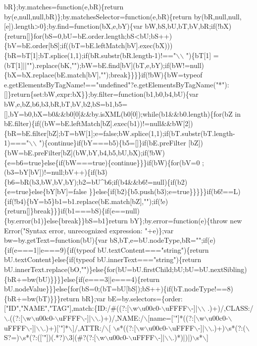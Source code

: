 \begin{DoxyCode}
{       bR\};by.matches=function(e,bR)\{return by(e,null,null,bR)\};by.matchesSelector=function(e,bR)\{return
       by(bR,null,null,[e]).length>0\};by.find=function(bX,e,bY)\{var
       bW,bS,bU,bT,bV,bR;if(!bX)\{return[]\}for(bS=0,bU=bE.order.length;bS<bU;bS++)\{bV=bE.order[bS];if((bT=bE.leftMatch[bV].exec(bX)))\{bR=bT[1];bT.splice(1,1);if(bR.substr(bR.length-1)!=="\(\backslash\)\(\backslash\)
      ")\{bT[1]
      =(bT[1]||"").replace(bK,"");bW=bE.find[bV](bT,e,bY);if(bW!=null)\{bX=bX.replace(bE.match[bV],"");break\}\}\}\}if(!bW)\{bW=typeof
       e.getElementsByTagName!=="undefined"?e.getElementsByTagName("*"):[]\}return\{set:bW,expr:bX\}\};by.filter=function(b1,b0,b4,bU)\{var
       bW,e,bZ,b6,b3,bR,bT,bV,b2,bS=b1,b5=[],bY=b0,bX=b0&&b0[0]&&by.isXML(b0[0]);while(b1&&b0.length)\{for(bZ in
       bE.filter)\{if((bW=bE.leftMatch[bZ].exec(b1))!=null&&bW[2])\{bR=bE.filter[bZ];bT=bW[1];e=false;bW.splice(1,1);if(bT.substr(bT.length-1)==="\(\backslash\)\(\backslash\)
      ")\{continue\}if(bY===b5)\{b5=[]\}if(bE.preFilter
      [bZ])\{bW=bE.preFilter[bZ](bW,bY,b4,b5,bU,bX);if(!bW)\{e=b6=true\}else\{if(bW===true)\{continue\}\}\}if(bW)\{for(bV=0
      ;(b3=bY[bV])!=null;bV++)\{if(b3)\{b6=bR(b3,bW,bV,bY);b2=bU^b6;if(b4&&b6!=null)\{if(b2)\{e=true\}else\{bY[bV]=false
      \}\}else\{if(b2)\{b5.push(b3);e=true\}\}\}\}\}if(b6!==L)\{if(!b4)\{bY=b5\}b1=b1.replace(bE.match[bZ],"");if(!e)\{return[]\}break\}\}\}if(b1===bS)\{if(e==null)\{by.error(b1)\}else\{break\}\}bS=b1\}return bY\};by.error=function(e)\{throw new
       Error("Syntax error, unrecognized expression: "+e)\};var bw=by.getText=function(bU)\{var
       bS,bT,e=bU.nodeType,bR="";if(e)\{if(e===1||e===9)\{if(typeof bU.textContent==="string")\{return bU.textContent\}else\{if(typeof
       bU.innerText==="string")\{return
       bU.innerText.replace(bO,"")\}else\{for(bU=bU.firstChild;bU;bU=bU.nextSibling)\{bR+=bw(bU)\}\}\}\}else\{if(e===3||e===4)\{return
       bU.nodeValue\}\}\}else\{for(bS=0;(bT=bU[bS]);bS++)\{if(bT.nodeType!==8)\{bR+=bw(bT)\}\}\}return bR\};var bE=by.selectors=\{order:["ID","NAME","TAG"],match:\{ID:/#((?:[\(\backslash\)w\(\backslash\)u00c0-\(\backslash\)uFFFF\(\backslash\)-]|\(\backslash\)\(\backslash\)
      .)+)/,CLASS:/\(\backslash\).((?:[\(\backslash\)w\(\backslash\)u00c0-\(\backslash\)uFFFF\(\backslash\)-]|\(\backslash\)\(\backslash\).)+)/,NAME:/\(\backslash\)[name=['}\textcolor{stringliteral}{"]*((?:[\(\backslash\)w\(\backslash\)u00c0-\(\backslash\)uFFFF\(\backslash\)-]|\(\backslash\)\(\backslash\).)+)['"}]*\(\backslash\)]/,ATTR:/\(\backslash\)[
      \(\backslash\)s*((?:[\(\backslash\)w\(\backslash\)u00c0-\(\backslash\)uFFFF\(\backslash\)-]|\(\backslash\)\(\backslash\).)+)\(\backslash\)s*(?:(\(\backslash\)S?=)\(\backslash\)s*(?:([\textcolor{stringliteral}{'"])(.*?)\(\backslash\)3|(#?(?:[\(\backslash\)w\(\backslash\)u00c0-\(\backslash\)uFFFF\(\backslash\)-]|\(\backslash\)\(\backslash\).)*)|)|)\(\backslash\)s*\(\backslash\)]
}
\end{DoxyCode}
